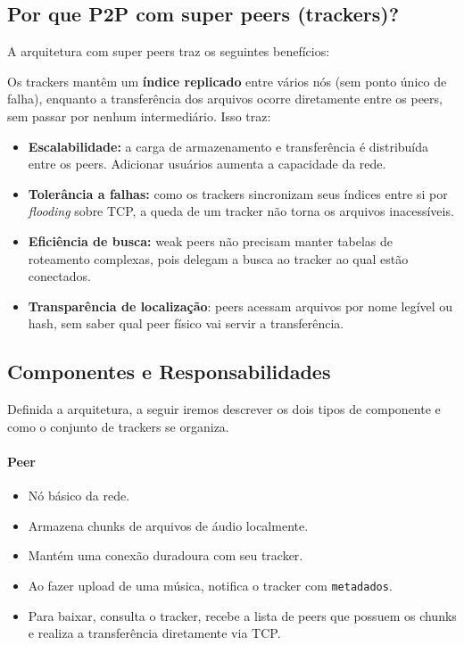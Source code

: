 \documentclass[12pt, a4paper]{article}
\begin{document}
\subsection{Por que P2P com super peers (trackers)?}

A arquitetura com super peers traz os seguintes benefícios:

Os trackers mantêm um \textbf{índice replicado} entre vários nós (sem ponto único de falha), enquanto a transferência dos arquivos ocorre diretamente entre os peers, sem passar por nenhum intermediário. Isso traz:

\begin{itemize}
    \item \textbf{Escalabilidade:} a carga de armazenamento e transferência é distribuída entre os peers. Adicionar usuários aumenta a capacidade da rede.
    \item \textbf{Tolerância a falhas:} como os trackers sincronizam seus índices entre si por \textit{flooding} sobre TCP, a queda de um tracker não torna os arquivos inacessíveis.
    \item \textbf{Eficiência de busca:} weak peers não precisam manter tabelas de roteamento complexas, pois delegam a busca ao tracker ao qual estão conectados.
    \item \textbf{Transparência de localização}: peers acessam arquivos por nome legível ou hash, sem saber qual peer físico vai servir a transferência.
\end{itemize}

\subsection{Componentes e Responsabilidades}\label{sec:componentes}

Definida a arquitetura, a seguir iremos descrever os dois tipos de componente e como o conjunto de trackers se organiza.

\paragraph{Peer}
\begin{itemize}
    \item Nó básico da rede.
    \item Armazena chunks de arquivos de áudio localmente.
    \item Mantém uma conexão duradoura com seu tracker.
    \item Ao fazer upload de uma música, notifica o tracker com \texttt{metadados}.
    \item Para baixar, consulta o tracker, recebe a lista de peers que possuem os chunks e realiza a transferência diretamente via TCP.
\end{itemize}
\end{document}
